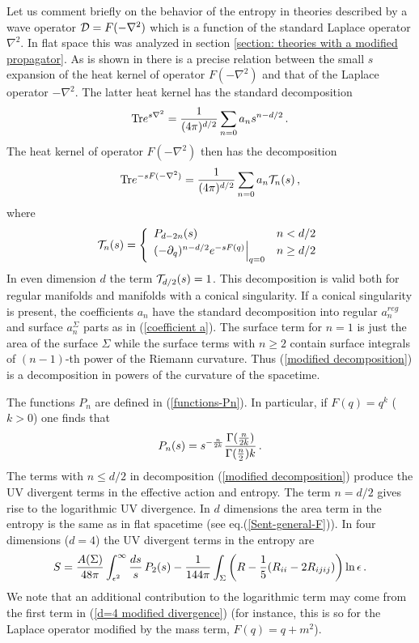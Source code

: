 \documentclass[12pt]{article}
\def\Tr{\hbox{Tr}}
\def\be{\begin{eqnarray}}
\def\ee{\end{eqnarray}}
\def\lb{\label}
\def\o{\over}
\begin{document}
Let us comment briefly on the behavior of the entropy in theories described by a wave operator  ${\cal D}=F(-\nabla^2)$ which is a function of the standard Laplace operator $\nabla^2$.
In flat space this was analyzed in section \ref{section: theories with a modified propagator}.
As is shown in \cite{Nesterov:2010yi} there is a precise relation between the small $s$ expansion of the heat kernel of operator $F(-\nabla^2)$ and that of the Laplace operator
$-\nabla^2$. The latter heat kernel has the standard decomposition
\be
\Tr e^{s\nabla^2}={1\o (4\pi )^{d/2}}\sum_{n=0} a_n s^{n-d/2}\, .
\lb{standard decomposition}
\ee
The heat kernel of operator $F(-\nabla^2)$ then  has the decomposition  \cite{Nesterov:2010yi}
\be
\Tr e^{-sF(-\nabla^2)}={1\o (4\pi )^{d/2}}\sum_{n=0} a_n {\cal T}_n(s)\, ,
\lb{modified decomposition}
\ee
where 
\begin{equation} \lb{exact coefficient}
  {\cal T}_n(s) = \left\{
              \begin{array}{ll}
                 P_{d-2n}(s)
                  &  n<d/2 \\
                (-\partial_q)^{n-d/2} e^{-s F(q)}\Big|_{q=0}
                  &  n\geq d/2
              \end{array}
    \right.
 \end{equation}
 In even dimension $d$ the term ${\cal T}_{d/2}(s)=1$.
  This decomposition is valid both for regular manifolds and manifolds with a conical singularity. If a conical singularity is present, the coefficients $a_n$ have the standard decomposition into regular $a_n^{reg}$ and surface $a_n^\Sigma$ parts as in (\ref{coefficient a}). The surface term for $n=1$ is just the area of the surface $\Sigma$ while the surface terms with $n\geq 2$ contain surface integrals of $(n-1)$-th power of the Riemann curvature. Thus (\ref{modified decomposition}) is a decomposition in powers of the curvature of the spacetime. 
  
The functions $P_n$ are defined in (\ref{functions-Pn}). In particular, if $F(q)=q^k$ ($k>0$) one finds that
\be
P_n(s)=s^{-{n\o 2k}}{\Gamma({n\o 2k})\o \Gamma({n\o 2})k}\, .
\lb{monom}
\ee
 The terms with $n\leq d/2$ in decomposition (\ref{modified decomposition}) produce the UV divergent terms in the effective action and entropy. The term $n=d/2$ gives rise to the logarithmic UV divergence. 
In $d$ dimensions the area term in the entropy is the same as in flat spacetime (see eq.(\ref{Sent-general-F})).
In four dimensions ($d=4$) the UV divergent terms in the entropy are
\be
S={A(\Sigma)\o 48\pi}\int_{\epsilon^2}^\infty {ds\o s}\, P_2(s)-{1\o 144\pi}\int_\Sigma \left({R}-{1\o 5}({R}_{ii}-2{R}_{ijij})\right)\ln\epsilon\, .
\lb{d=4 modified divergence}
\ee
We note that an additional contribution to the logarithmic term may come from the first term in (\ref{d=4 modified divergence}) (for instance, this is so for the Laplace operator modified  by the mass term,
$F(q)=q+m^2$).
\end{document}
